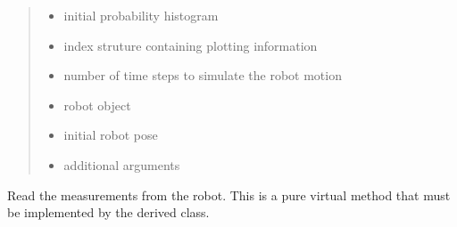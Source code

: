 \documentclass[letterpaper,10pt,english]{sphinxmanual}
\begin{document}
\begin{fulllineitems}
\begin{fulllineitems}
\begin{quote}
\begin{description}
\begin{itemize}
\item {} 
\sphinxAtStartPar
{} \textendash{} initial probability histogram

\item {} 
\sphinxAtStartPar
{} \textendash{} index struture containing plotting information

\item {} 
\sphinxAtStartPar
{} \textendash{} number of time steps to simulate the robot motion

\item {} 
\sphinxAtStartPar
{} \textendash{} robot object

\item {} 
\sphinxAtStartPar
{} \textendash{} initial robot pose

\item {} 
\sphinxAtStartPar
{} \textendash{} additional arguments

\end{itemize}

\end{description}\end{quote}

\end{fulllineitems}


\begin{fulllineitems}
\label{\detokenize{GridLocalization:GL.GL.GetMeasurements}}
\pysigstartsignatures
{}
\pysigstopsignatures
\sphinxAtStartPar
Read the measurements from the robot.
This is a pure virtual method that must be implemented by the derived class.

\end{fulllineitems}



\end{fulllineitems}
\end{document}
